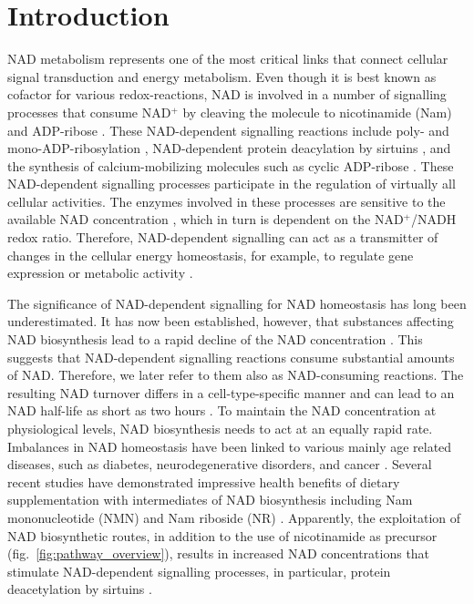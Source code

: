 
\section{Introduction}

NAD metabolism represents one of the most critical links that connect cellular signal transduction and energy metabolism. Even though it is best known as cofactor for various redox-reactions, NAD is involved in a number of signalling processes that consume NAD$^{+}$ by cleaving the molecule to nicotinamide (Nam) and ADP-ribose \cite{Verdin2015}. These NAD-dependent signalling reactions include poly- and mono-ADP-ribosylation \cite{Butepage2015,DeVos2012}, NAD-dependent protein deacylation by sirtuins \cite{Osborne2016}, and the synthesis of calcium-mobilizing molecules such as cyclic ADP-ribose \cite{Lee2012}. These NAD-dependent signalling processes participate in the regulation of virtually all cellular activities. The enzymes involved in these processes are sensitive to the available NAD concentration \cite{Ruggieri2015}, which in turn is dependent on the NAD$^{+}$/NADH redox ratio. Therefore, NAD-dependent signalling can act as a transmitter of changes in the cellular energy homeostasis, for example, to regulate gene expression or metabolic activity \cite{Koch-Nolte2009}.

The significance of NAD-dependent signalling for NAD homeostasis has long been underestimated. It has now been established, however, that substances affecting NAD biosynthesis lead to a rapid decline of the NAD concentration \cite{Buonvicino2018}. This suggests that NAD-dependent signalling reactions consume substantial amounts of NAD. Therefore, we later refer to them also as NAD-consuming reactions. The resulting NAD turnover differs in a cell-type-specific manner and can lead to an NAD half-life as short as two hours \cite{Liu2018}. To maintain the NAD concentration at physiological levels, NAD biosynthesis needs to act at an equally rapid rate. Imbalances in NAD homeostasis have been linked to various mainly age related diseases, such as diabetes, neurodegenerative disorders, and cancer \cite{Chiarugi2012,Verdin2015}. Several recent studies have demonstrated impressive health benefits of dietary supplementation with intermediates of NAD biosynthesis including Nam mononucleotide (NMN) and Nam riboside (NR) \cite{Yoshino2018}. Apparently, the exploitation of NAD biosynthetic routes, in addition to the use of nicotinamide as precursor (fig.~\ref{fig:pathway_overview}), results in increased NAD concentrations that stimulate NAD-dependent signalling processes, in particular, protein deacetylation by sirtuins \cite{North2004}.

